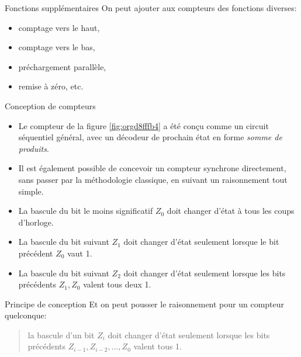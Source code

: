 \documentclass[presentation]{beamer}
\begin{document}
\begin{frame}[label={sec:orgad8ed5f}]{Fonctions supplémentaires}
On peut ajouter aux compteurs des fonctions diverses: 

\begin{itemize}
\item comptage vers le haut,
\item comptage vers le bas,
\item préchargement parallèle,
\item remise à zéro, etc.
\end{itemize}
\end{frame}

\begin{frame}[label={sec:orgdb8d3ec}]{Conception de compteurs}
\begin{itemize}
\item Le compteur de la figure \ref{fig:orgd8fffb4} a été conçu comme un circuit séquentiel général, avec un décodeur de prochain état en forme \emph{somme de produits}.

\item Il est également possible de concevoir un compteur synchrone directement, sans passer par la méthodologie classique, en suivant un raisonnement tout simple.

\item La bascule du bit le moins significatif \(Z_0\) doit changer d'état à tous les coups d'horloge.

\item La bascule du bit suivant \(Z_1\) doit changer d'état seulement lorsque le bit précédent \(Z_0\) vaut 1.

\item La bascule du bit suivant \(Z_2\) doit changer d'état seulement lorsque les bits précédents \(Z_1, Z_0\) valent tous deux 1.
\end{itemize}
\end{frame}

\begin{frame}[label={sec:orgeb05eef}]{Principe de conception}
Et on peut pousser le raisonnement pour un compteur quelconque:
\begin{quote}
la bascule d'un bit \(Z_i\)
doit changer d'état seulement lorsque les bits précédents
\(Z_{i-1},Z_{i-2},\ldots, Z_0\) valent tous 1.
\end{quote}
\end{frame}
\end{document}
